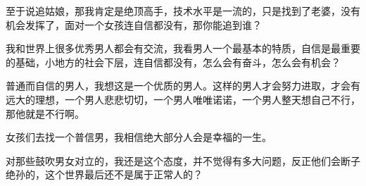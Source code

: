 \documentclass[UTF8,11pt,oneside]{ctexart}
\begin{document}
至于说追姑娘，那我肯定是绝顶高手，技术水平是一流的，只是找到了老婆，没有机会发挥了，面对一个女孩连自信都没有，那你能追到谁？

我和世界上很多优秀男人都会有交流，我看男人一个最基本的特质，自信是最重要的基础，小地方的社会下层，连自信都没有，怎么会有奋斗，怎么会有机会？

普通而自信的男人，我想这是一个优质的男人。这样的男人才会努力进取，才会有远大的理想，一个男人悲悲切切，一个男人唯唯诺诺，一个男人整天想自己不行，那他就是不行啊。


女孩们去找一个普信男，我相信绝大部分人会是幸福的一生。

对那些鼓吹男女对立的，我还是这个态度，并不觉得有多大问题，反正他们会断子绝孙的，这个世界最后还不是属于正常人的？
\end{document}
